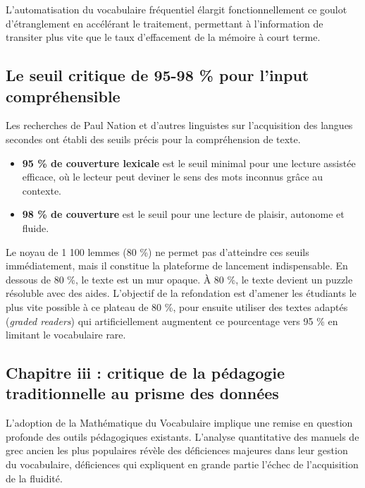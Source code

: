 {L'automatisation du vocabulaire fréquentiel élargit fonctionnellement ce goulot d'étranglement en
accélérant le traitement, permettant à l'information de transiter plus vite que le taux d'effacement
de la mémoire à court terme.



\subsection{Le seuil critique de 95-98 \% pour l'input compréhensible}

Les recherches de Paul Nation et d'autres linguistes sur l'acquisition des langues secondes ont
établi des seuils précis pour la compréhension de texte.

\begin{itemize}\item \textbf{95 \% de couverture lexicale} est le seuil minimal pour une lecture assistée efficace, où le lecteur peut deviner le sens des mots inconnus grâce au contexte.\cite{III-1-1-ref10}\item \textbf{98 \% de couverture} est le seuil pour une lecture de plaisir, autonome et fluide.\cite{III-1-1-ref42}\end{itemize}Le noyau de 1 100 lemmes (80 \%) ne permet pas d'atteindre ces seuils immédiatement, mais il
constitue la plateforme de lancement indispensable. En dessous de 80 \%, le texte est un mur opaque.
À 80 \%, le texte devient un puzzle résoluble avec des aides. L'objectif de la refondation est
d'amener les étudiants le plus vite possible à ce plateau de 80 \%, pour ensuite utiliser des textes
adaptés (\textit{graded readers}) qui artificiellement augmentent ce pourcentage vers 95 \% en
limitant le vocabulaire rare.\cite{III-1-1-ref44}



\subsection{Chapitre iii : critique de la pédagogie traditionnelle au prisme des données}

L'adoption de la \og Mathématique du Vocabulaire\fg{} implique une remise en question profonde des
outils pédagogiques existants. L'analyse quantitative des manuels de grec ancien les plus populaires
révèle des déficiences majeures dans leur gestion du vocabulaire, déficiences qui expliquent en
grande partie l'échec de l'acquisition de la fluidité.



}
